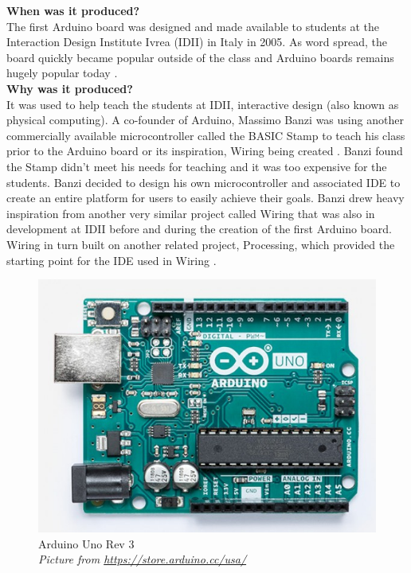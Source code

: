 \textbf{When was it produced?}\\
The first Arduino board was designed and made available to students at the Interaction Design Institute Ivrea (IDII) in Italy in 2005. As word spread, the board quickly became popular outside of the class and Arduino boards remains hugely popular today 
\cite{RN103}.\\

\textbf{Why was it produced?}\\
It was used to help teach the students at IDII, interactive design (also known as physical computing). A co-founder of Arduino, Massimo Banzi was using another commercially available microcontroller called the BASIC Stamp to teach his class prior to the Arduino board or its inspiration, Wiring being created \cite{RN103}. Banzi found the Stamp didn't meet his needs for teaching and it was too expensive for the students. Banzi decided to design his own microcontroller and associated IDE to create an entire platform for users to easily achieve their goals. Banzi drew heavy inspiration from another very similar project called Wiring that was also in development at IDII before and during the creation of the first Arduino board. Wiring in turn built on another related project, Processing, which provided the starting point for the IDE used in Wiring \cite{RN110}\cite{RN135} \cite{RN111}. \\


\begin{figure} \begin{center}
\includegraphics[width=.3\linewidth]{pics/Arduino_uno_3} 
\end{center} 
\caption{Arduino Uno Rev 3\\ \textit{\small{Picture from \url{https://store.arduino.cc/usa/}}}}
\label{ArduinoUno3}
\end{figure} 

